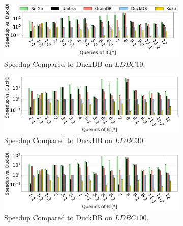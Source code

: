 \begin{figure}[ht]
    \centering
    \begin{subfigure}[b]{\linewidth}
        \centering
        \includegraphics[width=\linewidth]{./figures/exp/e2e_sf10.pdf}
        \vspace{-2em}
        \caption{Speedup Compared to DuckDB on $LDBC10$.}
        \label{fig:exp-e2e-sf10}
    \end{subfigure}
    \begin{subfigure}[b]{\linewidth}
        \centering
        \includegraphics[width=\linewidth]{./figures/exp/e2e_sf30.pdf}
        \vspace{-2em}
        \caption{Speedup Compared to DuckDB on $LDBC30$.}
        \label{fig:exp-e2e-sf30}
    \end{subfigure}
    \begin{subfigure}[b]{\linewidth}
        \centering
        \includegraphics[width=\linewidth]{./figures/exp/e2e_sf100.pdf}
        \vspace{-2em}
        \caption{Speedup Compared to DuckDB on $LDBC100$.}
        \label{fig:exp-e2e-sf30}
    \end{subfigure}
    \begin{subfigure}[b]{\linewidth}

\end{subfigure}
\end{figure}
